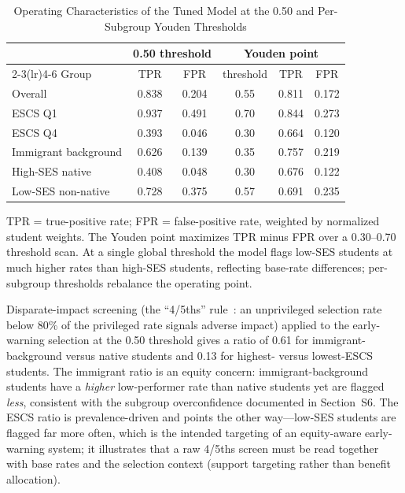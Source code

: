 \documentclass[journal]{IEEEtran}
\begin{document}
\begin{table}[!t]
\centering
\caption{Operating Characteristics of the Tuned Model at the 0.50 and Per-Subgroup Youden Thresholds}
\label{tab:supp-threshold}
\footnotesize
\begin{tabular}{lcc ccc}
\toprule
 & \multicolumn{2}{c}{0.50 threshold} & \multicolumn{3}{c}{Youden point} \\
\cmidrule(lr){2-3}\cmidrule(lr){4-6}
Group & TPR & FPR & threshold & TPR & FPR \\
\midrule
Overall & 0.838 & 0.204 & 0.55 & 0.811 & 0.172 \\
ESCS Q1 & 0.937 & 0.491 & 0.70 & 0.844 & 0.273 \\
ESCS Q4 & 0.393 & 0.046 & 0.30 & 0.664 & 0.120 \\
Immigrant background & 0.626 & 0.139 & 0.35 & 0.757 & 0.219 \\
High-SES native & 0.408 & 0.048 & 0.30 & 0.676 & 0.122 \\
Low-SES non-native & 0.728 & 0.375 & 0.57 & 0.691 & 0.235 \\
\bottomrule
\end{tabular}
\vspace{2pt}
{\footnotesize TPR = true-positive rate; FPR = false-positive rate, weighted by normalized student weights. The Youden point maximizes TPR minus FPR over a 0.30--0.70 threshold scan. At a single global threshold the model flags low-SES students at much higher rates than high-SES students, reflecting base-rate differences; per-subgroup thresholds rebalance the operating point.}
\end{table}

Disparate-impact screening (the ``4/5ths'' rule~\cite{feldman2015disparate}: an unprivileged selection rate below 80\% of the privileged rate signals adverse impact) applied to the early-warning selection at the 0.50 threshold gives a ratio of 0.61 for immigrant-background versus native students and 0.13 for highest- versus lowest-ESCS students. The immigrant ratio is an equity concern: immigrant-background students have a \emph{higher} low-performer rate than native students yet are flagged \emph{less}, consistent with the subgroup overconfidence documented in Section~S6. The ESCS ratio is prevalence-driven and points the other way---low-SES students are flagged far more often, which is the intended targeting of an equity-aware early-warning system; it illustrates that a raw 4/5ths screen must be read together with base rates and the selection context (support targeting rather than benefit allocation).
\end{document}
